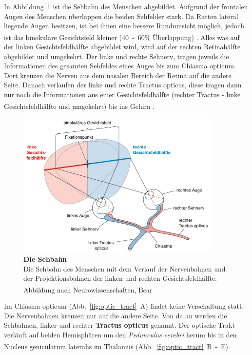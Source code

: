 \documentclass[12pt,a4paper,pdftex]{article}
\begin{document}
In Abbildung~\ref{fig:sehbahn_baer} ist die Sehbahn des Menschen abgebildet. Aufgrund der frontalen Augen des Menschen überlappen die beiden Sehfelder stark. Da Ratten lateral liegende Augen besitzen, ist bei ihnen eine bessere Rundumsicht möglich, jedoch ist das binokulare Gesichtsfeld kleiner (40~-~60\% Überlappung) \textsuperscript{\cite[30]{paxinos2014rat}}.
Alles was auf der linken Gesichtsfeldhälfte abgebildet wird, wird auf der rechten Retinahälfte abgebildet und umgekehrt. Der linke und rechte Sehnerv, tragen jeweils die Informationen des gesamten Sehfeldes eines Auges bis zum Chiasma opticum. Dort kreuzen die Nerven aus dem nasalen Bereich der Retina auf die andere Seite. Danach verlaufen der linke und rechte Tractus opticus,  diese tragen dann nur noch die Informationen aus einer Gesichtsfeldhälfte (rechter Tractus - linke Gesichtsfeldhälfte und umgekehrt) bis ins Gehirn \textsuperscript{\cite[15]{crossman2014neuroanatomy}}.

\begin{figure}[H]
    \centering
    \includegraphics[width = 0.9\textwidth]{pictures/visual/Sehbahn.png}
    \caption[Die Sehbahn]{\textbf{Die Sehbahn}\\
    Die Sehbahn des Menschen mit dem Verlauf der Nervenbahnen und der Projektionsbahnen der linken und rechten Gesichtsfeldhälfte.
    Abbildung nach Neurowissenschaften, Bear \textsuperscript{\cite[10]{neurowissenschaften_baer}}}
    \label{fig:sehbahn_baer}
\end{figure}

Im Chiasma opticum (Abb.~\ref{fig:optic_tract}~A) findet keine Verschaltung statt. Die Nervenbahnen kreuzen nur auf die andere Seite. Von da an werden die Sehbahnen, linker und rechter \textbf{Tractus opticus}  genannt. Der optische Trakt verläuft auf beiden Hemisphären um den \textit{Pedunculus cerebri} herum bis in den Nucleus geniculatum lateralis im Thalamus (Abb.~\ref{fig:optic_tract}~B~-~E). \textsuperscript{\cite[15]{crossman2014neuroanatomy}}
\end{document}
